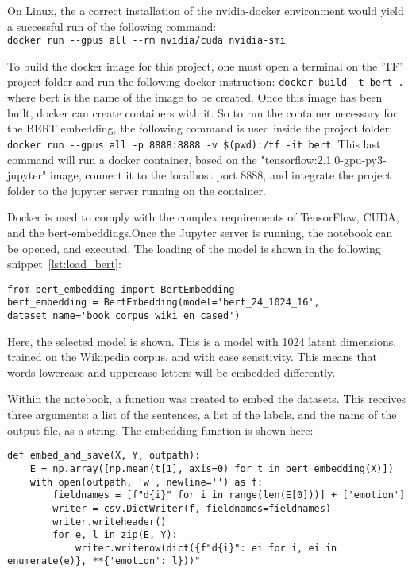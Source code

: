 On Linux, the a correct installation of the nvidia-docker environment would yield a successful run of the following command: \\ \lstinline{docker run --gpus all --rm nvidia/cuda nvidia-smi}

To build the docker image for this project, one must open a terminal on the 'TF' project folder and run the following docker instruction: \lstinline{docker build -t bert .} where bert is the name of the image to be created.
Once this image has been built, docker can create containers with it. So to run the container necessary for the BERT embedding, the following command is used inside the project folder: \lstinline{docker run --gpus all -p 8888:8888 -v $(pwd):/tf -it bert}.
This last command will run a docker container, based on the "tensorflow:2.1.0-gpu-py3-jupyter" image, connect it to the localhost port 8888, and integrate the project folder to the jupyter server running on the container.

Docker is used to comply with the complex requirements of TensorFlow, CUDA, and the bert-embeddings.Once the Jupyter server is running, the notebook can be opened, and executed. The loading of the model is shown in the following snippet~\ref{lst:load_bert}:

\begin{lstlisting}[caption={Loading BERT},label=lst:load_bert,frame=single]
from bert_embedding import BertEmbedding
bert_embedding = BertEmbedding(model='bert_24_1024_16', dataset_name='book_corpus_wiki_en_cased')
\end{lstlisting}

Here, the selected model is shown. This is a model with 1024 latent dimensions, trained on the Wikipedia corpus, and with case sensitivity. This means that words lowercase and uppercase letters will be embedded differently.

Within the notebook, a function was created to embed the datasets. This receives three arguments: a list of the sentences, a list of the labels, and the name of the output file, as a string. The embedding function is shown here:

\begin{lstlisting}[caption={Embedding with BERT},label=lst:embed_bert,frame=single]
def embed_and_save(X, Y, outpath):
    E = np.array([np.mean(t[1], axis=0) for t in bert_embedding(X)])
    with open(outpath, 'w', newline='') as f:
        fieldnames = [f"d{i}" for i in range(len(E[0]))] + ['emotion']
        writer = csv.DictWriter(f, fieldnames=fieldnames)
        writer.writeheader()
        for e, l in zip(E, Y):
            writer.writerow(dict({f"d{i}": ei for i, ei in enumerate(e)}, **{'emotion': l}))"
\end{lstlisting}


